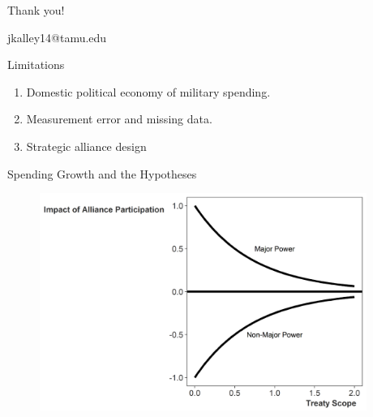 \documentclass[12pt]{beamer}
\begin{document}
 \begin{frame}[standout]

Thank you! 

jkalley14@tamu.edu

 \end{frame}



\appendix 



\begin{frame}{Limitations}

\begin{enumerate}
\item Domestic political economy of military spending. 
\item Measurement error and missing data. 
\item Strategic alliance design
\end{enumerate}

\end{frame}



\begin{frame}{Spending Growth and the Hypotheses}

\begin{figure}
	\centering
		\includegraphics[width=0.95\textwidth]{illus-arg.png}
	\label{fig:illus-arg}
\end{figure}


\end{frame}


\end{document}
